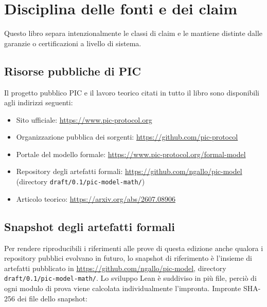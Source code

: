 \documentclass[10pt,oneside,openany]{book}
\newcommand{\mono}[1]{\texttt{#1}}
\begin{document}
\chapter{Disciplina delle fonti e dei claim}\label{app:claims}
Questo libro separa intenzionalmente le classi di claim e le mantiene distinte dalle garanzie o certificazioni a livello di sistema.

\section{Risorse pubbliche di PIC}
Il progetto pubblico PIC e il lavoro teorico citati in tutto il libro sono disponibili agli indirizzi seguenti:
\begin{itemize}
\item Sito ufficiale: \url{https://www.pic-protocol.org}
\item Organizzazione pubblica dei sorgenti: \url{https://github.com/pic-protocol}
\item Portale del modello formale: \url{https://www.pic-protocol.org/formal-model}
\item Repository degli artefatti formali: \url{https://github.com/ngallo/pic-model} (directory \mono{draft/0.1/pic-model-math/})
\item Articolo teorico: \url{https://arxiv.org/abs/2607.08906}
\end{itemize}

\section{Snapshot degli artefatti formali}
Per rendere riproducibili i riferimenti alle prove di questa edizione anche qualora i repository pubblici evolvano in futuro, lo snapshot di riferimento è l'insieme di artefatti pubblicato in \url{https://github.com/ngallo/pic-model}, directory \mono{draft/0.1/pic-model-math/}. Lo sviluppo Lean è suddiviso in più file, perciò di ogni modulo di prova viene calcolata individualmente l'impronta. Impronte SHA-256 dei file dello snapshot:
\end{document}

